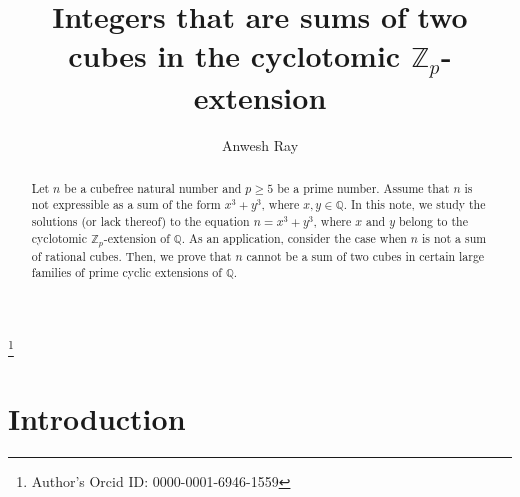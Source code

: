\documentclass[11pt]{amsart}
\newcommand{\Z}{\mathbb{Z}}
\numberwithin{equation}{section}
\begin{document}
\title[sums of cubes in the $\Z_p$-extension]{Integers that are sums of two cubes in the cyclotomic $\Z_p$-extension}


\author[A.~Ray]{Anwesh Ray}
\thanks{Author's Orcid ID: 0000-0001-6946-1559}
\address[Ray]{Chennai Mathematical Institute, H1, SIPCOT IT Park, Kelambakkam, Siruseri, Tamil Nadu 603103, India}




\maketitle

\begin{abstract}
 Let $n$ be a cubefree natural number and $p\geq 5$ be a prime number. Assume that $n$ is not expressible as a sum of the form $x^3+y^3$, where $x,y\in \mathbb{Q}$.  In this note,  we study the solutions (or lack thereof) to the equation $n=x^3+y^3$,  where $x$ and $y$ belong to the cyclotomic $\mathbb{Z}_p$-extension of $\mathbb{Q}$. As an application, consider the case when $n$ is not a sum of rational cubes. Then, we prove that $n$ cannot be a sum of two cubes in certain large families of prime cyclic extensions of $\mathbb{Q}$.
\end{abstract}

\section{Introduction}
\end{document}
